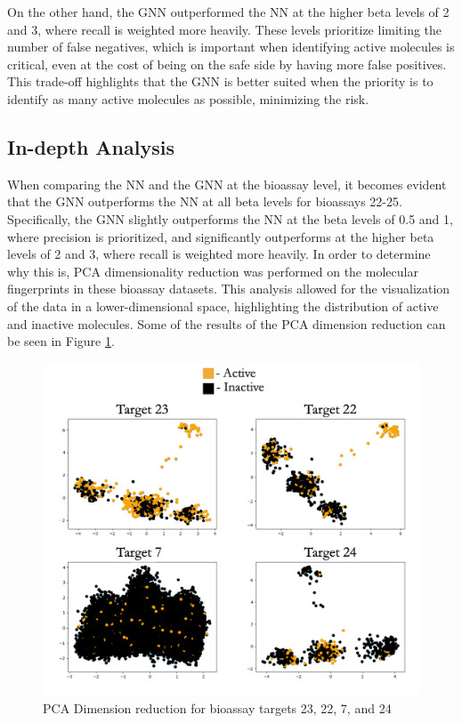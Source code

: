 \documentclass[10pt,twocolumn]{article}
\begin{document}
On the other hand, the GNN outperformed the NN at the higher beta levels of 2 and 3, where recall is weighted more heavily. These levels prioritize limiting the number of false negatives, which is important when identifying active molecules is critical, even at the cost of being on the safe side by having more false positives. This trade-off highlights that the GNN is better suited when the priority is to identify as many active molecules as possible, minimizing the risk. 

\subsection{In-depth Analysis}

When comparing the NN and the GNN at the bioassay level, it becomes evident that the GNN outperforms the NN at all beta levels for bioassays 22-25. Specifically, the GNN slightly outperforms the NN at the beta levels of 0.5 and 1, where precision is prioritized, and significantly outperforms at the higher beta levels of 2 and 3, where recall is weighted more heavily. In order to determine why this is, PCA dimensionality reduction was performed on the molecular fingerprints in these bioassay datasets. This analysis allowed for the visualization of the data in a lower-dimensional space, highlighting the distribution of active and inactive molecules. Some of the results of the PCA dimension reduction can be seen in Figure \ref{fig:first-page}. 


\begin{figure}[h]
    \centering
    \includegraphics[width=.95\linewidth]{PCA.png}    \caption{
        PCA Dimension reduction for bioassay targets 23, 22, 7, and 24 
    }
    \label{fig:first-page}
\end{figure}
\end{document}
